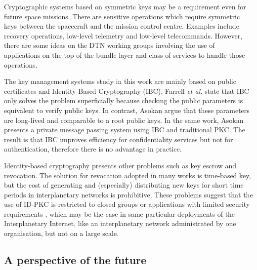 Cryptographic systems based on symmetric keys may be a requirement even for future space missions. There are sensitive operations which require symmetric keys between the spacecraft and the mission control centre. Examples include recovery operations, low-level telemetry and low-level telecommands. However, there are some ideas on the DTN working groups involving the use of applications on the top of the bundle layer and class of services to handle those operations. 


   

The key management systems study in this work are mainly based on public certificates and Identity Based Cryptography (IBC). Farrell \textit{et al.} \cite{irtf-dtnrg-sec-overview-06} state that IBC only solves the problem superficially because checking the public parameters is equivalent to verify public keys. In contrast,  Asokan \cite{asokan2007towards} argue that these parameters are long-lived and comparable to a root public keys. In the same work, Asokan presents a private message passing system using IBC and traditional PKC. The result is that IBC improves efficiency for confidentiality services but not for authentication, therefore there is no advantage in practice.  

Identity-based cryptography presents other problems such as key escrow and revocation. The solution for revocation adopted in many works is time-based key, but the cost of generating and (especially) distributing new keys for short time periods in interplanetary networks is prohibitive. These problems suggest that the use of ID-PKC is restricted to closed groups or applications with limited security requirements \cite{al2003certificateless}, which may be the case in same particular deployments of the Interplanetary Internet, like an interplanetary network administrated by one organisation, but not on a large scale.

\subsection{A perspective of the future}

